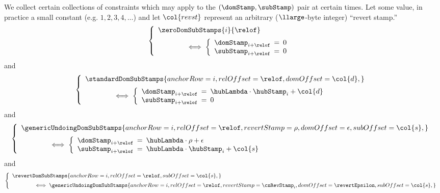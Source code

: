 We collect certain collections of constraints which may apply to the $(\domStamp, \subStamp)$ pair at certain times. Let  some value, in practice a small constant (e.g. $1, 2, 3, 4, \dots$) and let $\col{revst}$ represent an arbitrary ($\llarge$-byte integer) ``revert stamp.''
\[
	\left\{ \begin{array}{l}
		\zeroDomSubStamps {i}{\relof}
		\vspace{2mm} \\ \qquad \qquad \iff
		\left\{\begin{array}{lcl}
			\domStamp_{i + \relof} & \!\!\! = \!\!\! & 0 \\
			\subStamp_{i + \relof} & \!\!\! = \!\!\! & 0 \\
		\end{array}\right.
	\end{array} \right.
\]
and
\[
	\left\{ \begin{array}{l}
		\standardDomSubStamps {
			anchorRow = i       ,
			relOffset = \relof  ,
			domOffset = \col{d} ,
		}
		\vspace{2mm} \\ \qquad \qquad \iff
		\left\{\begin{array}{lcl}
			\domStamp_{i + \relof} & \!\!\! = \!\!\! & \hubLambda \cdot \hubStamp_{i} + \col{d} \\
			\subStamp_{i + \relof} & \!\!\! = \!\!\! & 0                                        \\
		\end{array}\right.
	\end{array} \right.
\]
and
\[
	\left\{ \begin{array}{l}
		\genericUndoingDomSubStamps {
			anchorRow   = i        ,
			relOffset   = \relof   ,
			revertStamp = \rho     ,
			domOffset   = \epsilon ,
			subOffset   = \col{s}  ,
		}
		\vspace{2mm} \\ \qquad \qquad \iff
		\left\{\begin{array}{lcl}
			\domStamp_{i + \relof} & \!\!\! = \!\!\! & \hubLambda \cdot \rho + \epsilon         \\
			\subStamp_{i + \relof} & \!\!\! = \!\!\! & \hubLambda \cdot \hubStamp_{i} + \col{s} \\
		\end{array}\right.
	\end{array} \right.
\]
and
\[
	\left\{ \begin{array}{l}
		\revertDomSubStamps {
			anchorRow = i       ,
			relOffset = \relof  ,
			subOffset = \col{s} ,
			}
		\vspace{2mm} \\ \qquad \qquad \iff
		\genericUndoingDomSubStamps {
			anchorRow   = i               ,
			relOffset   = \relof          ,
			revertStamp = \cnRevStamp_{i} ,
			domOffset   = \revertEpsilon  ,
			subOffset   = \col{s}         ,
		}
	\end{array} \right.
\]
